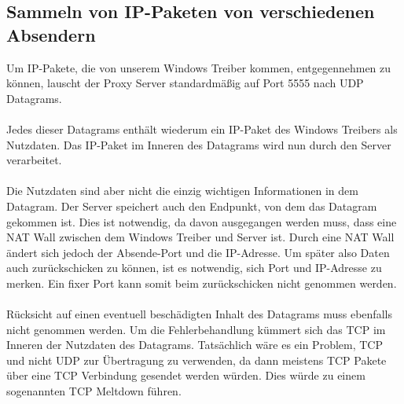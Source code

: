 \subsection{Sammeln von IP-Paketen von verschiedenen Absendern}
Um IP-Pakete, die von unserem Windows Treiber kommen, entgegennehmen zu können, lauscht der Proxy Server standardmäßig auf Port 5555 nach UDP Datagrams. 
\\\\
Jedes dieser Datagrams enthält wiederum ein IP-Paket des Windows Treibers als Nutzdaten. Das IP-Paket im Inneren des Datagrams wird nun durch den Server verarbeitet.
\\\\
Die Nutzdaten sind aber nicht die einzig wichtigen Informationen in dem Datagram. Der Server speichert auch den Endpunkt, von dem das Datagram gekommen ist. Dies ist notwendig, da davon ausgegangen werden muss, dass eine NAT Wall zwischen dem Windows Treiber und Server ist. Durch eine NAT Wall ändert sich jedoch der Absende-Port und die IP-Adresse. Um später also Daten auch zurückschicken zu können, ist es notwendig, sich Port und IP-Adresse zu merken. Ein fixer Port kann somit beim zurückschicken nicht genommen werden.
\\\\ 
Rücksicht auf einen eventuell beschädigten Inhalt des Datagrams muss ebenfalls nicht genommen werden. Um die Fehlerbehandlung kümmert sich das TCP im Inneren der Nutzdaten des Datagrams. Tatsächlich wäre es ein Problem, TCP und nicht UDP zur Übertragung zu verwenden, da dann meistens TCP Pakete über eine TCP Verbindung gesendet werden würden. Dies würde zu einem sogenannten TCP Meltdown führen.

